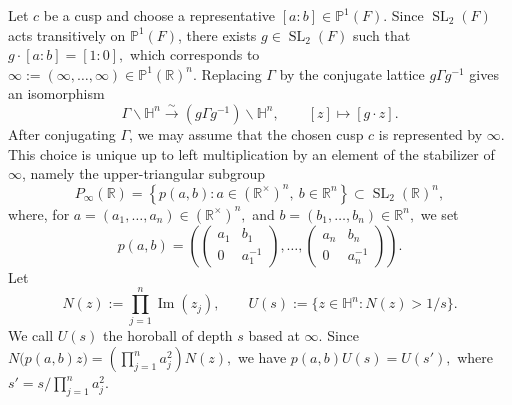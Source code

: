 \documentclass[12 pt]{amsart}
\theoremstyle{definition}
\newcommand{\Hu}{\mathbb{H}}
\begin{document}
Let $c$ be a cusp and choose a representative
$[a:b]\in\mathbb P^1(F)$. Since $\operatorname{SL}_2(F)$ acts
transitively on $\mathbb P^1(F)$, there exists
$g\in\operatorname{SL}_2(F)$ such that
\(
g\cdot[a:b]=[1:0],
\)
which corresponds to \\
\(
\infty:=(\infty,\ldots,\infty)
\in\mathbb P^1(\mathbb R)^n.
\)
Replacing $\Gamma$ by the conjugate lattice $g\Gamma g^{-1}$ gives an
isomorphism
\[
\Gamma\backslash\Hu^n
\xrightarrow{\sim}
(g\Gamma g^{-1})\backslash\Hu^n,
\qquad
[z]\longmapsto[g\cdot z].
\]
After conjugating $\Gamma$, we may
assume that the chosen cusp $c$ is represented by $\infty$. This
choice is unique up to left multiplication by an element of the
stabilizer of $\infty$, namely the upper-triangular subgroup
\begin{equation}\label{the upper-triangular subgroup}
P_\infty(\mathbb R)
=
\left\{
p(a,b):
a\in (\mathbb R^\times)^n,\ b\in \mathbb R^n
\right\}
\subset \operatorname{SL}_2(\mathbb R)^n,
\end{equation}
where, for \(a=(a_1,\dots,a_n)\in(\mathbb R^\times)^n, \) and \(b=(b_1,\dots,b_n)\in\mathbb R^n, \) we set
\[
p(a,b)
=
\left(
\begin{pmatrix}
a_1&b_1\\
0&a_1^{-1}
\end{pmatrix},
\dots,
\begin{pmatrix}
a_n&b_n\\
0&a_n^{-1}
\end{pmatrix}
\right).
\]
Let
\[
N(z):=\prod_{j=1}^n\operatorname{Im}(z_j),\qquad
U(s):=\{z\in\mathbb H^n:N(z)>1/s\}.
\]
We call $U(s)$ the horoball of depth $s$ based at $\infty$. Since
\(
N\bigl(p(a,b)z\bigr)=\left(\prod_{j=1}^n a_j^2\right)N(z),
\)
we have
\(
p(a,b)U(s)=U(s'),\) where \(s'=s/\prod_{j=1}^n a_j^2\).
\end{document}
